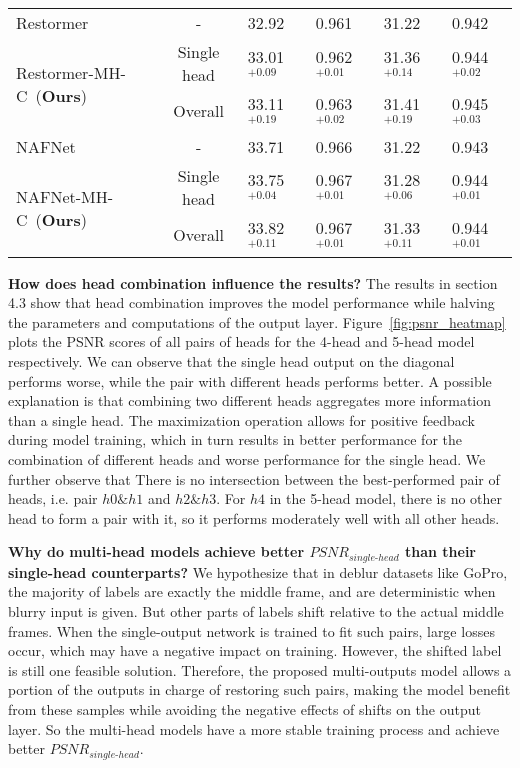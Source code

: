 \documentclass[letterpaper]{article} \usepackage{aaai23}  \usepackage{times}  \usepackage{helvet}  \usepackage{courier}  \usepackage[hyphens]{url}  \usepackage{graphicx} \urlstyle{rm} \def\UrlFont{\rm}  \usepackage{natbib}  \usepackage{caption} \frenchspacing  \setlength{\pdfpagewidth}{8.5in} \setlength{\pdfpageheight}{11in} \usepackage{algorithm}
\begin{document}
\begin{table*}[t]
\begin{tabular}{l|c|ll|ll}
Restormer~\cite{zamir2022restormer}            &           - & 32.92 & 0.961 & 31.22 & 0.942 \\ \multirow{2}{*}{Restormer-MH-C~(\textbf{Ours})}& Single head & 33.01$^{+0.09}$ & 0.962$^{+0.01}$ & 31.36$^{+0.14}$ & 0.944$^{+0.02}$ \\ &     Overall & 33.11$^{+0.19}$ & 0.963$^{+0.02}$ & 31.41$^{+0.19}$ & 0.945$^{+0.03}$ \\ \midrule
NAFNet~\cite{chen2022simple}                   &           - & 33.71 & 0.966 & 31.22 & 0.943 \\ \multirow{2}{*}{NAFNet-MH-C~(\textbf{Ours})}   & Single head & 33.75$^{+0.04}$ & 0.967$^{+0.01}$ & 31.28$^{+0.06}$ & 0.944$^{+0.01}$ \\ &     Overall & 33.82$^{+0.11}$ & 0.967$^{+0.01}$ & 31.33$^{+0.11}$ & 0.944$^{+0.01}$ \\ \bottomrule
\end{tabular}\end{table*}


\textbf{How does head combination influence the results?} The results in section 4.3 show that head combination improves the model performance while halving the parameters and computations of the output layer. Figure~\ref{fig:psnr_heatmap} plots the PSNR scores of all pairs of heads for the 4-head and 5-head model respectively. We can observe that the single head output on the diagonal performs worse, while the pair with different heads performs better. A possible explanation is that combining two different heads aggregates more information than a single head. The maximization operation allows for positive feedback during model training, which in turn results in better performance for the combination of different heads and worse performance for the single head. We further observe that There is no intersection between the best-performed pair of heads, i.e. pair $h0\&h1$ and $h2\&h3$. For $h4$ in the 5-head model, there is no other head to form a pair with it, so it performs moderately well with all other heads.

\textbf{Why do multi-head models achieve better $P\!S\!N\!R_{single\mbox{-}head}$ than their single-head counterparts?} We hypothesize that in deblur datasets like GoPro, the majority of labels are exactly the middle frame, and are deterministic when blurry input is given. But other parts of labels shift relative to the actual middle frames. When the single-output network is trained to fit such pairs, large losses occur, which may have a negative impact on training. However, the shifted label is still one feasible solution. Therefore, the proposed multi-outputs model allows a portion of the outputs in charge of restoring such pairs, making the model benefit from these samples while avoiding the negative effects of shifts on the output layer. So the multi-head models have a more stable training process and achieve better $P\!S\!N\!R_{single\mbox{-}head}$.
\end{document}

